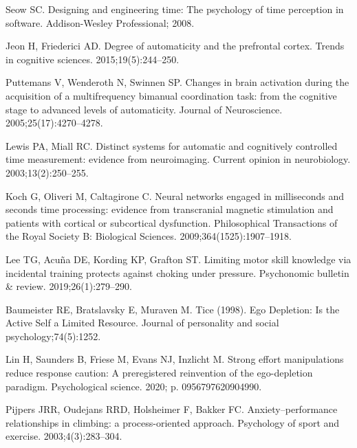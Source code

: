 \documentclass[10pt,letterpaper]{article}
\begin{document}
\begin{thebibliography}{10}
  Seow SC.
  \newblock Designing and engineering time: The psychology of time perception in
    software.
  \newblock Addison-Wesley Professional; 2008.
  
  Jeon H, Friederici AD.
  \newblock Degree of automaticity and the prefrontal cortex.
  \newblock Trends in cognitive sciences. 2015;19(5):244--250.
  
  Puttemans V, Wenderoth N, Swinnen SP.
  \newblock Changes in brain activation during the acquisition of a
    multifrequency bimanual coordination task: from the cognitive stage to
    advanced levels of automaticity.
  \newblock Journal of Neuroscience. 2005;25(17):4270--4278.
  
  Lewis PA, Miall RC.
  \newblock Distinct systems for automatic and cognitively controlled time
    measurement: evidence from neuroimaging.
  \newblock Current opinion in neurobiology. 2003;13(2):250--255.
  
  Koch G, Oliveri M, Caltagirone C.
  \newblock Neural networks engaged in milliseconds and seconds time processing:
    evidence from transcranial magnetic stimulation and patients with cortical or
    subcortical dysfunction.
  \newblock Philosophical Transactions of the Royal Society B: Biological
    Sciences. 2009;364(1525):1907--1918.
  
  Lee TG, Acuña DE, Kording KP, Grafton ST.
  \newblock Limiting motor skill knowledge via incidental training protects
    against choking under pressure.
  \newblock Psychonomic bulletin \& review. 2019;26(1):279--290.
  
  Baumeister RE, Bratslavsky E, Muraven M.
  \newblock Tice (1998). Ego Depletion: Is the Active Self a Limited Resource.
  \newblock Journal of personality and social psychology;74(5):1252.
  
  Lin H, Saunders B, Friese M, Evans NJ, Inzlicht M.
  \newblock Strong effort manipulations reduce response caution: A preregistered
    reinvention of the ego-depletion paradigm.
  \newblock Psychological science. 2020; p. 0956797620904990.
  
  Pijpers JRR, Oudejans RRD, Holsheimer F, Bakker FC.
  \newblock Anxiety--performance relationships in climbing: a process-oriented
    approach.
  \newblock Psychology of sport and exercise. 2003;4(3):283--304.
  

\end{thebibliography}
\end{document}
